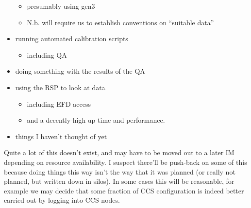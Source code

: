 \begin{itemize}
   \begin{itemize}
      \item presumably using gen3
      \item N.b. will require us to establish conventions on ``suitable data''
   \end{itemize}
   \item running automated calibration scripts
   \begin{itemize}
      \item including QA
   \end{itemize}
   \item doing something with the results of the QA
   \item using the RSP to look at data
   \begin{itemize}
      \item including EFD access
      \item and a decently-high up time and performance.
   \end{itemize}
   \item things I haven't thought of yet
\end{itemize}


Quite a lot of this doesn't exist, and may have to be moved out to a later IM depending on resource
availability.  I suspect there'll be push-back on some of this because doing things this way isn't the way
that it was planned (or really not planned, but written down in silos).  In some cases this will be
reasonable, for example we may decide that some fraction of CCS configuration is indeed better carried out by
logging into CCS nodes.
